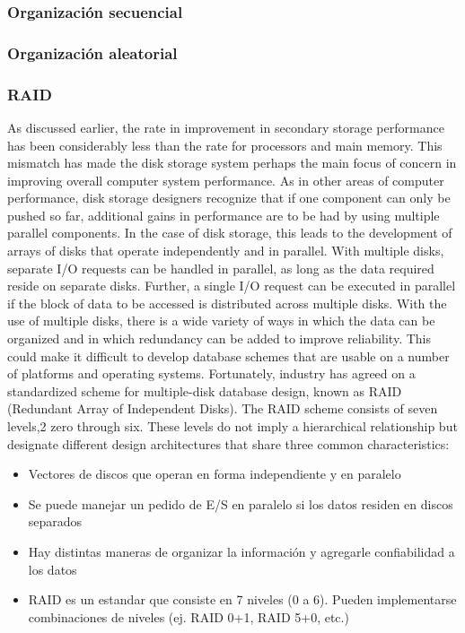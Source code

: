 \subsubsection{Organización secuencial}
\subsubsection{Organización aleatorial}

\subsubsection{RAID}
As discussed earlier, the rate in improvement in secondary storage performance
has been considerably less than the rate for processors and main memory. This
mismatch has made the disk storage system perhaps the main focus of concern in
improving overall computer system performance.
As in other areas of computer performance, disk storage designers recognize
that if one component can only be pushed so far, additional gains in performance
are to be had by using multiple parallel components. In the case of disk storage, this
leads to the development of arrays of disks that operate independently and in parallel.
With multiple disks, separate I/O requests can be handled in parallel, as long
as the data required reside on separate disks. Further, a single I/O request can be
executed in parallel if the block of data to be accessed is distributed across multiple
disks.
With the use of multiple disks, there is a wide variety of ways in which the
data can be organized and in which redundancy can be added to improve reliability.
This could make it difficult to develop database schemes that are usable
on a number of platforms and operating systems. Fortunately, industry has
agreed on a standardized scheme for multiple-disk database design, known as
RAID (Redundant Array of Independent Disks). The RAID scheme consists
of seven levels,2 zero through six. These levels do not imply a hierarchical relationship
but designate different design architectures that share three common
characteristics:

\begin{itemize}
\item Vectores de discos que operan en forma independiente y en paralelo
\item Se puede manejar un pedido de E/S en paralelo si los datos residen en discos separados
\item Hay distintas maneras de organizar la información y agregarle confiabilidad a los datos
\item RAID es un estandar que consiste en 7 niveles (0 a 6). Pueden implementarse combinaciones de niveles (ej. RAID 0+1, RAID 5+0, etc.)
\end{itemize}
	
